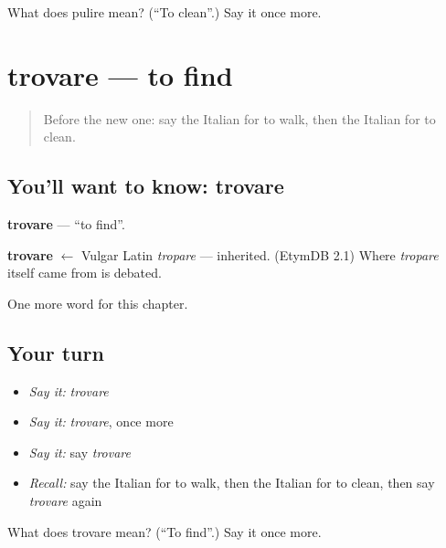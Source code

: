 \begin{tcolorbox}[breakable,colback=teal!4,colframe=teal!35!black,title={Before you move on}]
What does pulire mean? (\textquotedblleft{}To clean\textquotedblright{}.) Say it once more.
\end{tcolorbox}
\section[trovare]{trovare — to find}

\label{lesson:IT-C136-trovare}



\begin{quote}
Before the new one: say the Italian for to walk, then the Italian for to clean.
\end{quote}

\subsection*{You'll want to know: trovare}
\textbf{trovare} — \textquotedblleft{}to find\textquotedblright{}.

\begin{cousinweb}
\textbf{trovare} $\leftarrow$ Vulgar Latin \emph{tropare} — inherited. (EtymDB 2.1) Where \emph{tropare} itself came from is debated.
\end{cousinweb}

\begin{grammarlens}[title={What you've built}]
One more word for this chapter.
\end{grammarlens}

\subsection*{Your turn}
\begin{itemize}
\raggedright
  \item \emph{Say it:} \emph{trovare}
  \item \emph{Say it:} \emph{trovare}, once more
  \item \emph{Say it:} say \emph{trovare}
  \item \emph{Recall:} say the Italian for to walk, then the Italian for to clean, then say \emph{trovare} again
\end{itemize}

\begin{tcolorbox}[breakable,colback=teal!4,colframe=teal!35!black,title={Before you move on}]
What does trovare mean? (\textquotedblleft{}To find\textquotedblright{}.) Say it once more.
\end{tcolorbox}
